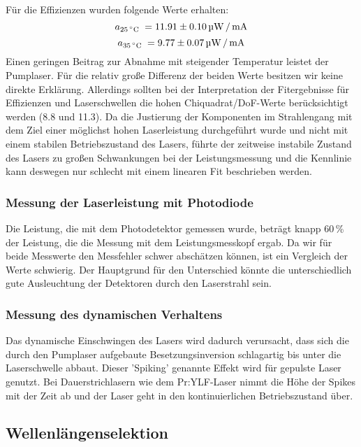Für die Effizienzen wurden folgende Werte erhalten:
\begin{equation*}
a_{25\text{\grad}} = 11.91\pm0.10\,\text{\textmu W\,/\,mA}
\end{equation*}
\begin{equation*}
a_{35\text{\grad}} = 9.77\pm0.07\,\text{\textmu W\,/\,mA}
\end{equation*}
Einen geringen Beitrag zur Abnahme mit steigender Temperatur leistet der Pumplaser.
Für die relativ große Differenz der beiden Werte besitzen wir keine direkte Erklärung.
Allerdings sollten bei der Interpretation der Fitergebnisse für Effizienzen und
Laserschwellen die hohen Chiquadrat/DoF-Werte berücksichtigt werden (8.8 und 11.3).
Da die Justierung der Komponenten im Strahlengang mit dem Ziel einer möglichst hohen Laserleistung
durchgeführt wurde und nicht mit einem stabilen Betriebszustand des Lasers,
führte der zeitweise instabile Zustand des Lasers zu großen Schwankungen bei der Leistungsmessung
und die Kennlinie kann deswegen nur schlecht mit einem linearen Fit beschrieben werden.


\subsubsection{Messung der Laserleistung mit Photodiode}

Die Leistung, die mit dem Photodetektor gemessen wurde,
beträgt knapp 60\,\% der Leistung, die die Messung mit dem Leistungsmesskopf ergab.
Da wir für beide Messwerte den Messfehler schwer abschätzen können,
ist ein Vergleich der Werte schwierig.
Der Hauptgrund für den Unterschied könnte die unterschiedlich gute Ausleuchtung der Detektoren durch
den Laserstrahl sein.

\subsubsection{Messung des dynamischen Verhaltens}

Das dynamische Einschwingen des Lasers wird dadurch verursacht,
dass sich die durch den Pumplaser aufgebaute Besetzungsinversion
schlagartig bis unter die Laserschwelle abbaut.
Dieser 'Spiking' genannte Effekt wird für gepulste Laser genutzt.
Bei Dauerstrichlasern wie dem Pr:YLF-Laser nimmt die Höhe der Spikes mit der Zeit ab und der Laser
geht in den kontinuierlichen Betriebszustand über.


\subsection{Wellenlängenselektion}

